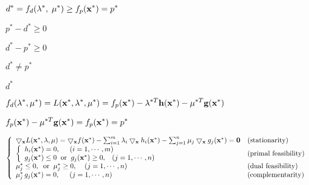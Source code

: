 \documentclass{article}
\def\lthtmlcheckvsize{\ifdim\ht\sizebox<\vsize 
  \ifdim\wd\sizebox<\hsize\expandafter\hfill\fi \expandafter\vfill
  \else\expandafter\vss\fi}%
\begin{document}
{\newpage\clearpage
{}%
$\displaystyle d^*=f_d({\bf\lambda}^*,\;{\bf\mu}^*)\ge f_p({\bf x}^*)=p^*$%
\lthtmlindisplaymathZ
\lthtmlcheckvsize\clearpage}

{\newpage\clearpage
{}%
$ p^*-d^*\ge 0$%
\lthtmlindisplaymathZ
\lthtmlcheckvsize\clearpage}

{\newpage\clearpage
{}%
$ d^*-p^*\ge 0$%
\lthtmlindisplaymathZ
\lthtmlcheckvsize\clearpage}

{\newpage\clearpage
{}%
$ d^*\ne p^*$%
\lthtmlindisplaymathZ
\lthtmlcheckvsize\clearpage}

{\newpage\clearpage
{}%
$\displaystyle d^*$%
\lthtmlindisplaymathZ
\lthtmlcheckvsize\clearpage}

{\newpage\clearpage
{}%
$\displaystyle f_d({\bf\lambda}^*,{\bf\mu}^*)= L({\bf x}^*,{\bf\lambda}^*,{\bf\mu}^*)
=f_p({\bf x}^*)-{\bf\lambda}^{*T}{\bf h}({\bf x}^*)-{\bf\mu}^{*T}{\bf g}({\bf x}^*)$%
\lthtmlindisplaymathZ
\lthtmlcheckvsize\clearpage}

{\newpage\clearpage
{}%
$\displaystyle f_p({\bf x}^*)-{\bf\mu}^{*T}{\bf g}({\bf x}^*) =f_p({\bf x}^*)=p^*$%
\lthtmlindisplaymathZ
\lthtmlcheckvsize\clearpage}

{\newpage\clearpage
{}%
$\displaystyle \left\{\begin{array}{ll}
\bigtriangledown_{\bf x} L({\bf x}^*,{\bf\lambda},{\bf\mu})
=\bigtriangledown_{\bf x} f({\bf x}^*)
-\sum_{i=1}^m\lambda_i \bigtriangledown_{\bf x} h_i({\bf x}^*)
-\sum_{j=1}^n\mu_j     \bigtriangledown_{\bf x} g_j({\bf x}^*)={\bf0}
& \mbox{(stationarity)}  \\
\left\{\begin{array}{l}
h_i({\bf x}^*)=0,\;\;\;\;\;(i=1,\cdots,m)\\
g_j({\bf x}^*)\le 0\;\;\mbox{or}\;\; g_j({\bf x}^*)\ge 0,\;\;\;
(j=1,\cdots,n)
\end{array}\right.&\mbox{(primal feasibility)}  \\
\mu_j^*\le 0,\;\;\mbox{or}\;\;\mu_j^*\ge 0,\;\;\;\;(j=1,\cdots,n)&
\mbox{(dual feasibility)} \\
\mu_j^*\,g_j({\bf x}^*)=0,\;\;\;\;\;(j=1,\cdots,n) &
\mbox{(complementarity)}
\end{array}\right.$%
\lthtmlindisplaymathZ
\lthtmlcheckvsize\clearpage}
\end{document}
